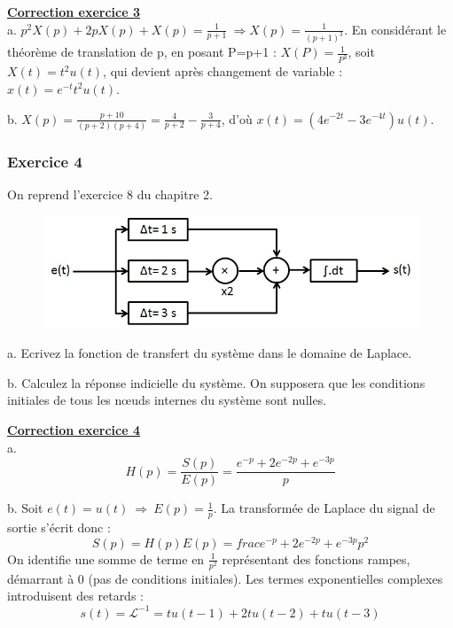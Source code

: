 \documentclass[11pt]{report}
\begin{document}
	\textbf{\underline{Correction exercice 3}}\\
	
	a. $p^{2}X(p)+2pX(p)+X(p)=\frac{1}{p+1}~\Rightarrow X(p)=\frac{1}{(p+1)^{3}}$. En considérant le théorème de translation de p, en posant P=p+1 : $X(P)=\frac{1}{P^{3}}$, soit $X(t)=t^{2}u(t)$, qui devient après changement de variable : $x(t)=e^{-t}t^{2}u(t)$.
	
	b. $X(p)=\frac{p+10}{(p+2)(p+4)} = \frac{4}{p+2}-\frac{3}{p+4}$, d'où $x(t) = (4e^{-2t}-3e^{-4t})u(t)$.
	
	\vspace{1\baselineskip}
	
	
	\subsubsection{Exercice 4}
	
	On reprend l'exercice 8 du chapitre 2.
	
	
	\begin{figure}[h!]
		\centering
		\includegraphics[scale=0.5]{images/Exo_2_6.jpg} 
	\end{figure}
	
	a. Ecrivez la fonction de transfert du système dans le domaine de Laplace.
	
	b. Calculez la réponse indicielle du système. On supposera que les conditions initiales de tous les nœuds internes du système sont nulles. 
	
	\vspace{1\baselineskip}
	
	\textbf{\underline{Correction exercice 4}}\\
	
	a. \begin{equation*}
	H(p)=\frac{S(p)}{E(p)}=\frac{e^{-p}+2e^{-2p}+e^{-3p}}{p}
	\end{equation*}
	
	b. Soit $e(t)=u(t)~\Rightarrow~E(p)=\frac{1}{p}$. La transformée de Laplace du signal de sortie s'écrit donc :
	\begin{equation*}
	S(p)=H(p)E(p)=frac{e^{-p}+2e^{-2p}+e^{-3p}}{p^2}
	\end{equation*}
	On identifie une somme de terme en $\frac{1}{p^2}$ représentant des fonctions rampes, démarrant à 0 (pas de conditions initiales). Les termes exponentielles complexes introduisent des retards :
	\begin{equation*}
	s(t)=\mathcal{L}^{-1}=tu(t-1)+2tu(t-2)+tu(t-3)
	\end{equation*}
	
\end{document}
